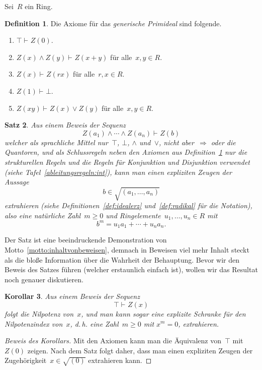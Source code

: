 \documentclass[a4paper,ngerman,12pt]{scrartcl}
\theoremstyle{definition}
\newtheorem{defn}{Definition}[section]
\theoremstyle{plain}
\newtheorem{kor}[defn]{Korollar}
\newtheorem{satz}[defn]{Satz}
\theoremstyle{remark}
\newcommand{\seq}[1]{\mathrel{\vdash\!\!\!_{#1}}}
\renewcommand{\_}{\mathpunct{.}\,}
\newcommand{\?}{\,{:}\,}
\begin{document}
Sei~$R$ ein Ring.

\begin{defn}\label{defn:genprime}Die Axiome für das \emph{generische Primideal}
sind folgende.
\begin{enumerate}
\item[1.] $\top \seq{} Z(0).$
\item[2.] $Z(x) \wedge Z(y) \seq{} Z(x+y)$ für alle~$x,y \in R$.
\item[3.] $Z(x) \seq{} Z(rx)$ für alle~$r,x \in R$.
\item[4.] $Z(1) \seq{} \bot.$
\item[5.] $Z(xy) \seq{} Z(x) \vee Z(y)$ für alle~$x,y \in R$.
\end{enumerate}
\end{defn}

\begin{satz}\label{satz:genprime}Aus einem Beweis der Sequenz
\[ Z(a_1) \wedge \cdots \wedge Z(a_n) \seq{} Z(b) \]
welcher als sprachliche Mittel nur~$\top$, $\bot$, $\wedge$ und~$\vee$, nicht
aber~$\Rightarrow$ oder die Quantoren, und als Schlussregeln neben den Axiomen
aus Definition~\ref{defn:genprime} nur die
strukturellen Regeln und die Regeln für Konjunktion und Disjunktion verwendet (siehe
Tafel~\ref{ableitungsregeln:int}), kann man einen expliziten Zeugen der Aussage
\[ b \in \sqrt{(a_1,\ldots,a_n)} \]
extrahieren (siehe Definitionen~\ref{def:idealerz} und~\ref{def:radikal} für
die Notation), also eine natürliche Zahl~$m \geq 0$ und
Ringelemente~$u_1,\ldots,u_n \in R$ mit
\[ b^m = u_1 a_1 + \cdots + u_n a_n. \]
\end{satz}

Der Satz ist eine beeindruckende
Demonstration von Motto~\ref{motto:inhaltvonbeweisen}, demnach in
Beweisen viel mehr Inhalt steckt als die bloße Information
über die Wahrheit der Behauptung. Bevor wir den Beweis des Satzes führen (welcher
erstaunlich einfach ist), wollen wir das Resultat noch genauer
diskutieren.

\begin{kor}Aus einem Beweis der Sequenz
\[ \top \seq{} Z(x) \]
folgt die Nilpotenz von~$x$, und man kann sogar eine explizite Schranke
für den Nilpotenzindex von~$x$, d.\,h. eine Zahl~$m \geq 0$ mit $x^m = 0$,
extrahieren.
\end{kor}
\begin{proof}[Beweis des Korollars] Mit den Axiomen kann man die Äquivalenz
von~$\top$ mit~$Z(0)$ zeigen. Nach dem Satz folgt daher, dass man einen
expliziten Zeugen der Zugehörigkeit~$x \in \sqrt{(0)}$ extrahieren
kann.\end{proof}
\end{document}
